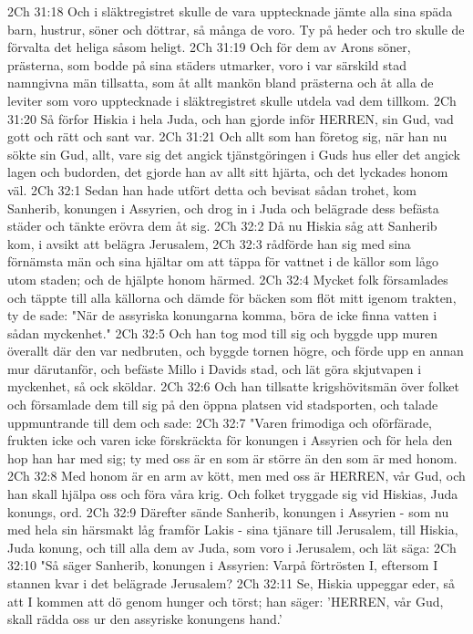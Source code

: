2Ch 31:18  Och i släktregistret skulle de vara upptecknade jämte alla sina späda barn, hustrur, söner och döttrar, så många de voro. Ty på heder och tro skulle de förvalta det heliga såsom heligt.
2Ch 31:19  Och för dem av Arons söner, prästerna, som bodde på sina städers utmarker, voro i var särskild stad namngivna män tillsatta, som åt allt mankön bland prästerna och åt alla de leviter som voro upptecknade i släktregistret skulle utdela vad dem tillkom.
2Ch 31:20  Så förfor Hiskia i hela Juda, och han gjorde inför HERREN, sin Gud, vad gott och rätt och sant var.
2Ch 31:21  Och allt som han företog sig, när han nu sökte sin Gud, allt, vare sig det angick tjänstgöringen i Guds hus eller det angick lagen och budorden, det gjorde han av allt sitt hjärta, och det lyckades honom väl.
2Ch 32:1  Sedan han hade utfört detta och bevisat sådan trohet, kom Sanherib, konungen i Assyrien, och drog in i Juda och belägrade dess befästa städer och tänkte erövra dem åt sig.
2Ch 32:2  Då nu Hiskia såg att Sanherib kom, i avsikt att belägra Jerusalem,
2Ch 32:3  rådförde han sig med sina förnämsta män och sina hjältar om att täppa för vattnet i de källor som lågo utom staden; och de hjälpte honom härmed.
2Ch 32:4  Mycket folk församlades och täppte till alla källorna och dämde för bäcken som flöt mitt igenom trakten, ty de sade: "När de assyriska konungarna komma, böra de icke finna vatten i sådan myckenhet."
2Ch 32:5  Och han tog mod till sig och byggde upp muren överallt där den var nedbruten, och byggde tornen högre, och förde upp en annan mur därutanför, och befäste Millo i Davids stad, och lät göra skjutvapen i myckenhet, så ock sköldar.
2Ch 32:6  Och han tillsatte krigshövitsmän över folket och församlade dem till sig på den öppna platsen vid stadsporten, och talade uppmuntrande till dem och sade:
2Ch 32:7  "Varen frimodiga och oförfärade, frukten icke och varen icke förskräckta för konungen i Assyrien och för hela den hop han har med sig; ty med oss är en som är större än den som är med honom.
2Ch 32:8  Med honom är en arm av kött, men med oss är HERREN, vår Gud, och han skall hjälpa oss och föra våra krig. Och folket tryggade sig vid Hiskias, Juda konungs, ord.
2Ch 32:9  Därefter sände Sanherib, konungen i Assyrien - som nu med hela sin härsmakt låg framför Lakis - sina tjänare till Jerusalem, till Hiskia, Juda konung, och till alla dem av Juda, som voro i Jerusalem, och lät säga:
2Ch 32:10  "Så säger Sanherib, konungen i Assyrien: Varpå förtrösten I, eftersom I stannen kvar i det belägrade Jerusalem?
2Ch 32:11  Se, Hiskia uppeggar eder, så att I kommen att dö genom hunger och törst; han säger: 'HERREN, vår Gud, skall rädda oss ur den assyriske konungens hand.'
